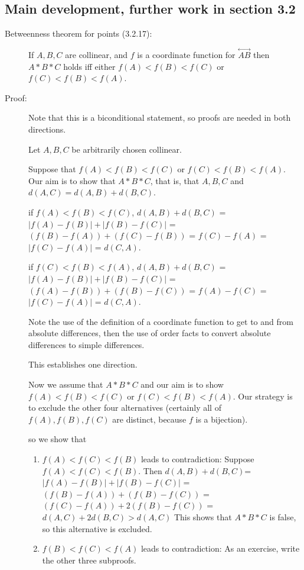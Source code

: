 \documentclass[12pt]{article}
\newcommand\Line[1]{\overset{\leftrightarrow}{#1}}
\begin{document}
\subsection{Main development, further work in section 3.2}

\begin{description}

\item[Betweenness theorem for points (3.2.17):]  If $A,B,C$ are collinear, and $f$ is a coordinate function for $\Line{AB}$ then $A*B*C$ holds iff either $f(A)<f(B)<f(C)$ or $f(C)<f(B)<f(A)$.

\item[Proof:]  Note that this is a biconditional statement, so proofs are needed in both directions.

Let $A,B,C$ be arbitrarily chosen collinear.

Suppose that $f(A)<f(B)<f(C)$ or $f(C)<f(B)<f(A)$.  Our aim is to show that $A*B*C$, that is, that $A,B,C$ and $d(A,C)=d(A,B)+d(B,C)$.

if $f(A)<f(B)<f(C)$, $d(A,B)+d(B,C)$ = $|f(A)-f(B)| + |f(B)-f(C)|$ = $(f(B)-f(A)) + (f(C)-f(B))$ = $f(C)-f(A)$ = $|f(C)-f(A)|$ = $d(C,A)$.

if $f(C)<f(B)<f(A)$, $d(A,B)+d(B,C)$ = $|f(A)-f(B)| + |f(B)-f(C)|$ = $(f(A)-f(B)) + (f(B)-f(C))$ = $f(A)-f(C)$ = $|f(C)-f(A)|$ = $d(C,A)$.

Note the use of the definition of a coordinate function to get to and from absolute differences, then the use of order facts to convert absolute differences to simple differences.

This establishes one direction. 

Now we assume that $A*B*C$ and our aim is to show  $f(A)<f(B)<f(C)$ or $f(C)<f(B)<f(A)$.  Our strategy is to exclude the other four alternatives (certainly
all of $f(A), f(B), f(C)$ are distinct, because $f$ is a bijection).

so we show that

\begin{enumerate}

\item $f(A)<f(C)<f(B)$ leads to contradiction:  Suppose $f(A)<f(C)<f(B)$.  Then $d(A,B)+d(B,C)$= $|f(A)-f(B)| + |f(B)-f(C)|$ = $(f(B)-f(A)) + (f(B)-f(C))$ = $(f(C)-f(A)) + 2(f(B)-f(C))$ = $d(A,C)+2d(B,C)>d(A,C)$  This shows
that $A*B*C$ is false, so this alternative is excluded.

\item $f(B)<f(C)<f(A)$ leads to contradiction:  As an exercise, write the other three subproofs.


\end{enumerate}
\end{description}
\end{document}

